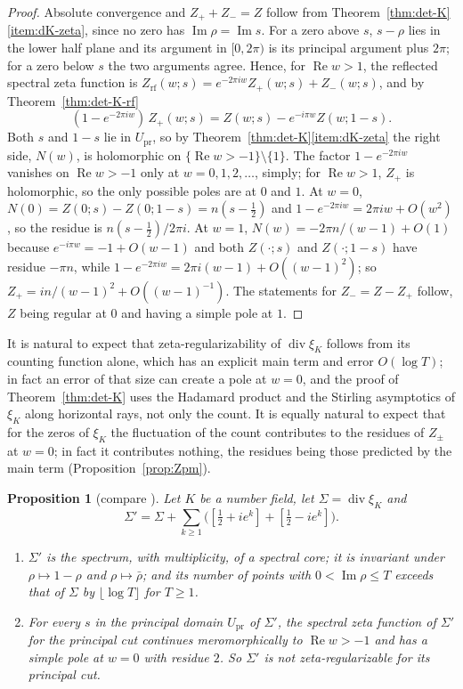 \documentclass[11pt]{amsart}
\theoremstyle{plain}
\newtheorem{proposition}[theorem]{Proposition}
\theoremstyle{definition}
\theoremstyle{remark}
\numberwithin{equation}{section}
\DeclareMathOperator{\divisor}{div}
\DeclareMathOperator{\Ima}{Im}
\DeclareMathOperator{\Rea}{Re}
\renewcommand{\Re}{\Rea}
\renewcommand{\Im}{\Ima}
\begin{document}
\begin{proof}
Absolute convergence and $Z_++Z_-=Z$ follow from
Theorem~\ref{thm:det-K}\ref{item:dK-zeta}, since no zero has
$\Im\rho=\Im s$. For a zero above $s$, $s-\rho$ lies in the lower half
plane and its argument in $[0,2\pi)$ is its principal argument plus
$2\pi$; for a zero below $s$ the two arguments agree. Hence, for
$\Re w>1$, the reflected spectral zeta function is
$Z_{\mathrm{rf}}(w;s)=e^{-2\pi iw}Z_+(w;s)+Z_-(w;s)$, and by
Theorem~\ref{thm:det-K-rf}
\[
(1-e^{-2\pi iw})\,Z_+(w;s)=Z(w;s)-e^{-i\pi w}Z(w;1-s).
\]
Both $s$ and $1-s$ lie in $U_{\mathrm{pr}}$, so by
Theorem~\ref{thm:det-K}\ref{item:dK-zeta} the right side, $N(w)$, is
holomorphic on $\{\Re w>-1\}\setminus\{1\}$. The factor
$1-e^{-2\pi iw}$ vanishes on $\Re w>-1$ only at $w=0,1,2,\dots$, simply;
for $\Re w>1$, $Z_+$ is holomorphic, so the only possible poles are at
$0$ and $1$. At $w=0$, $N(0)=Z(0;s)-Z(0;1-s)=n(s-\tfrac12)$ and
$1-e^{-2\pi iw}=2\pi iw+O(w^2)$, so the residue is
$n(s-\frac12)/2\pi i$. At $w=1$, $N(w)=-2\pi n/(w-1)+O(1)$ because
$e^{-i\pi w}=-1+O(w-1)$ and both $Z(\cdot;s)$ and $Z(\cdot;1-s)$ have
residue $-\pi n$, while $1-e^{-2\pi iw}=2\pi i(w-1)+O((w-1)^2)$; so
$Z_+=in/(w-1)^2+O((w-1)^{-1})$. The statements for $Z_-=Z-Z_+$ follow,
$Z$ being regular at $0$ and having a simple pole at $1$.
\end{proof}

It is natural to expect that zeta-regularizability of $\divisor\xi_K$
follows from its counting function alone, which has an explicit main
term and error $O(\log T)$; in fact an error of that size can create a
pole at $w=0$, and the proof of Theorem~\ref{thm:det-K} uses the
Hadamard product and the Stirling asymptotics of $\xi_K$ along
horizontal rays, not only the count. It is equally natural to expect
that for the zeros of $\xi_K$ the fluctuation of the count contributes
to the residues of $Z_\pm$ at $w=0$; in fact it contributes nothing,
the residues being those predicted by the main term
(Proposition~\ref{prop:Zpm}).

\begin{proposition}[{compare \cite[Remark~(3.4)(2), p.~147]%
{Deninger1992Local}}]\label{prop:N-count}
Let $K$ be a number field, let $\Sigma=\divisor\xi_K$ and
\[
\Sigma'=\Sigma+\sum_{k\ge1}\bigl([\tfrac12+ie^k]+[\tfrac12-ie^k]\bigr).
\]
\begin{enumerate}[label=(\roman*)]
\item\label{item:Nc-core} $\Sigma'$ is the spectrum, with multiplicity,
  of a spectral core; it is invariant under $\rho\mapsto1-\rho$ and
  $\rho\mapsto\bar\rho$; and its number of points with
  $0<\Im\rho\le T$ exceeds that of $\Sigma$ by $\lfloor\log T\rfloor$
  for $T\ge1$.
\item\label{item:Nc-pole} For every $s$ in the principal domain
  $U_{\mathrm{pr}}$ of $\Sigma'$, the spectral zeta function of
  $\Sigma'$ for the principal cut continues meromorphically to
  $\Re w>-1$ and has a simple pole at $w=0$ with residue $2$. So
  $\Sigma'$ is not zeta-regularizable for its principal cut.
\end{enumerate}
\end{proposition}
\end{document}
